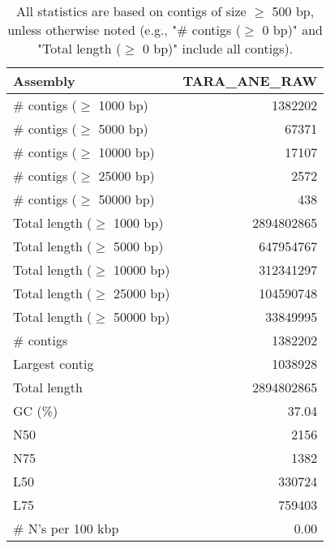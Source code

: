 \documentclass[12pt,a4paper]{article}
\begin{document}
\begin{table}[ht]
\begin{center}
\caption{All statistics are based on contigs of size $\geq$ 500 bp, unless otherwise noted (e.g., "\# contigs ($\geq$ 0 bp)" and "Total length ($\geq$ 0 bp)" include all contigs).}
\begin{tabular}{|l*{1}{|r}|}
\hline
Assembly & TARA\_ANE\_RAW \\ \hline
\# contigs ($\geq$ 1000 bp) & 1382202 \\ \hline
\# contigs ($\geq$ 5000 bp) & 67371 \\ \hline
\# contigs ($\geq$ 10000 bp) & 17107 \\ \hline
\# contigs ($\geq$ 25000 bp) & 2572 \\ \hline
\# contigs ($\geq$ 50000 bp) & 438 \\ \hline
Total length ($\geq$ 1000 bp) & 2894802865 \\ \hline
Total length ($\geq$ 5000 bp) & 647954767 \\ \hline
Total length ($\geq$ 10000 bp) & 312341297 \\ \hline
Total length ($\geq$ 25000 bp) & 104590748 \\ \hline
Total length ($\geq$ 50000 bp) & 33849995 \\ \hline
\# contigs & 1382202 \\ \hline
Largest contig & 1038928 \\ \hline
Total length & 2894802865 \\ \hline
GC (\%) & 37.04 \\ \hline
N50 & 2156 \\ \hline
N75 & 1382 \\ \hline
L50 & 330724 \\ \hline
L75 & 759403 \\ \hline
\# N's per 100 kbp & 0.00 \\ \hline
\end{tabular}
\end{center}
\end{table}
\end{document}
